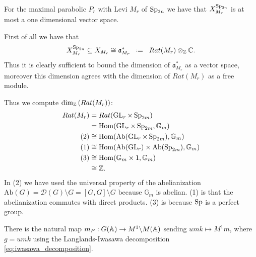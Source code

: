 \begin{example}\label{ex:characters}
    For the maximal parabolic \(P_r\) with Levi \(M_r\) of \(\operatorname{Sp}_{2n}\) we have that \( X_{M_r}^{\operatorname{Sp}_{2n}}\) is at most a one dimensional \C vector space. 

    First of all we have that \cite[I.1.4]{moeglinSpectralDecompositionEisenstein1995}
         \[ X_{M_r}^{\Sp_{2n}} \subseteq X_{M_r} \cong \mathfrak{a}_{M_r}^*\defeq Rat(M_r) \tensor_\Z \C.\]
        Thus it is clearly sufficient to bound the dimension of \(\mathfrak{a}_{M_r}^*\) as a \C vector space, moreover this dimension agrees with the dimension of \(Rat(M_r)\) as a free \Z module. 

        Thus we compute \(\dim_\Z(Rat(M_r))\):
        \begin{equation*}
            \begin{aligned}
                Rat(M_r) &= Rat(\GL_r \times \Sp_{2m}) \\
                         &= \Hom(\GL_r \times \Sp_{2m}, \mathbb{G}_m) \\
                         (2)&\cong \Hom(\mathrm{Ab}(\GL_r \times \Sp_{2m}), \mathbb{G}_m) \\
                         (1)&\cong \Hom(\mathrm{Ab}(\GL_r) \times \mathrm{Ab}(\Sp_{2m}), \mathbb{G}_m) \\
                         (3)&\cong \Hom(\mathbb{G}_m \times 1, \mathbb{G}_m) \\
                         &\cong \Z.
            \end{aligned}
        \end{equation*}
        In (2) we have used the universal property of the abelianization \(\mathrm{Ab}(G) = \mathcal{D}(G) \setminus G = [G, G] \setminus G \) because \(\mathbb{G}_m\) is abelian. (1) is that the abelianization commutes with direct products. (3) is because \(\operatorname{Sp}\) is a perfect group.
\end{example}


There is the natural map \(m_P: G(\A) \to M^1 \backslash M(\A)\) sending \(umk \mapsto M^1 m\), where \(g = umk\) using the Langlands-Iwasawa decomposition \ref{eq:iwasawa_decomposition}.

